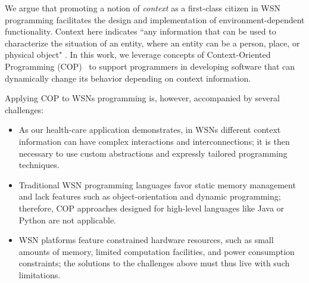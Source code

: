 We argue that promoting a notion of \emph{context} as a first-class
citizen in WSN programming facilitates the design and implementation
of environment-dependent functionality. Context here indicates ``any
information that can be used to characterize the situation of an
entity, where an entity can be a person, place, or physical object"
\cite{dey99}. In this work, we leverage concepts of Context-Oriented
Programming (COP)~\cite{hirschfeld08} to support programmers in
developing software that can dynamically change its behavior depending
on context
information. %


Applying COP to WSNs programming is, however, accompanied by several challenges:
\begin{itemize}\compresslist
\item As our health-care application demonstrates, in WSNs
  different context information can have complex interactions and
  interconnections; it is then necessary to use custom abstractions
  and expressly tailored programming techniques.
\item Traditional WSN programming languages favor static memory
  management and lack features such as object-orientation and dynamic
  programming; therefore, COP approaches designed for high-level
  languages like Java or Python are not applicable.
\item WSN platforms feature constrained hardware resources, such as
  small amounts of memory, limited computation facilities, and power
  consumption constraints; the solutions to the challenges above must
  thus live with such limitations.
\end{itemize}

